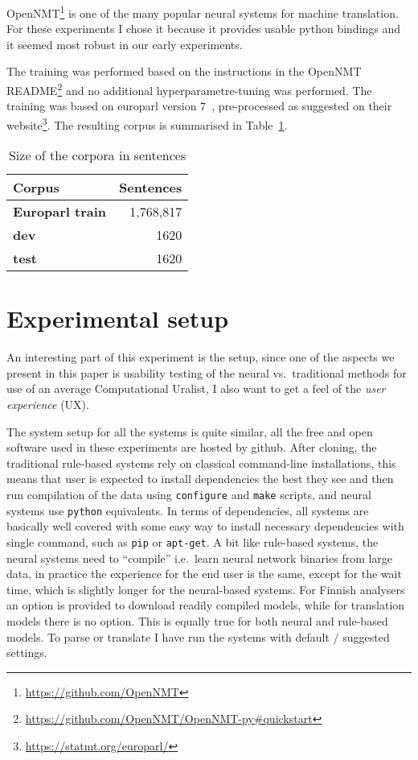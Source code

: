 \documentclass[a4paper,notitlepage]{article}
\begin{document}
OpenNMT\footnote{\url{https://github.com/OpenNMT}} is one of the many popular
neural systems for machine translation. For these experiments I chose it because
it provides usable python bindings and it seemed most robust in our early
experiments.

The training was performed based on the instructions in the OpenNMT
README\footnote{\url{https://github.com/OpenNMT/OpenNMT-py\#quickstart}} and no
additional hyperparametre-tuning was performed. The training was based on
europarl version 7~\citep{koehn2005europarl}, pre-processed as suggested on
their website\footnote{\url{https://statmt.org/europarl/}}. The resulting
corpus is summarised in Table~\ref{table:corpora}.

\begin{table}
\begin{center}
    \begin{tabular}{lr}
        \toprule
        Corpus & \bf Sentences \\
        \midrule
        \bf Europarl train & 1,768,817 \\
        \bf dev & 1620 \\
        \bf test & 1620 \\
        \bottomrule
    \end{tabular}
    \caption{Size of the corpora in sentences
\label{table:corpora}}
\end{center}
\end{table}

\section{Experimental setup}
\label{sec:setup}

An interesting part of this experiment is the setup, since one of the aspects we
present in this paper is usability testing of the neural vs.\ traditional methods
for use of an average Computational Uralist, I also want to get a feel of the
\textit{user experience} (UX).

The system setup for all the systems is quite similar, all the free and open
software used in these experiments are hosted by github. After cloning, the
traditional rule-based systems rely on classical command-line installations,
this means that user is expected to install dependencies the best they see and
then run compilation of the data using \texttt{configure} and \texttt{make}
scripts, and neural systems use \texttt{python} equivalents. In terms of
dependencies, all systems are basically well covered with some easy way to
install necessary dependencies with single command, such as \texttt{pip} or
\texttt{apt-get}. A bit like rule-based systems, the neural systems need to
``compile'' i.e.\ learn neural network binaries from large data, in practice the
experience for the end user is the same, except for the wait time, which is
slightly longer for the neural-based systems.  For Finnish analysers an option
is provided to download readily compiled models, while for translation models
there is no option.  This is equally true for both neural and rule-based models.
To parse or translate I have run the systems with default / suggested settings.
\end{document}
